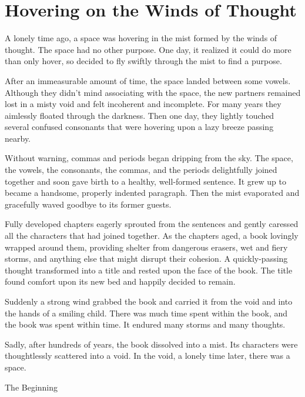 \chapter{Hovering on the Winds of Thought}


A lonely time ago, a space was hovering in the mist formed by the winds of thought. The space had no other purpose. One day, it realized it could do more than only hover, so decided to fly swiftly through the mist to find a purpose.

After an immeasurable amount of time, the space landed between some vowels. Although they didn't mind associating with the space, the new partners remained lost in a misty void and felt incoherent and incomplete. For many years they aimlessly floated through the darkness. Then one day, they lightly touched several confused consonants that were hovering upon a lazy breeze passing nearby.

Without warning, commas and periods began dripping from the sky. The space, the vowels, the consonants, the commas, and the periods delightfully joined together and soon gave birth to a healthy, well-formed sentence. It grew up to became a handsome, properly indented paragraph. Then the mist evaporated and gracefully waved goodbye to its former guests.

Fully developed chapters eagerly sprouted from the sentences and gently caressed all the characters that had joined together. As the chapters aged, a book lovingly wrapped around them, providing shelter from dangerous erasers, wet and fiery storms, and anything else that might disrupt their cohesion. A quickly-passing thought transformed into a title and rested upon the face of the book. The title found comfort upon its new bed and happily decided to remain.

Suddenly a strong wind grabbed the book and carried it from the void and into the hands of a smiling child. There was much time spent within the book, and the book was spent within time. It endured many storms and many thoughts.

Sadly, after hundreds of years, the book dissolved into a mist. Its characters were thoughtlessly scattered into a void.
\newpage
In the void, a lonely time later, there was a space.
\vspace*{\fill}

\centering
The Beginning
